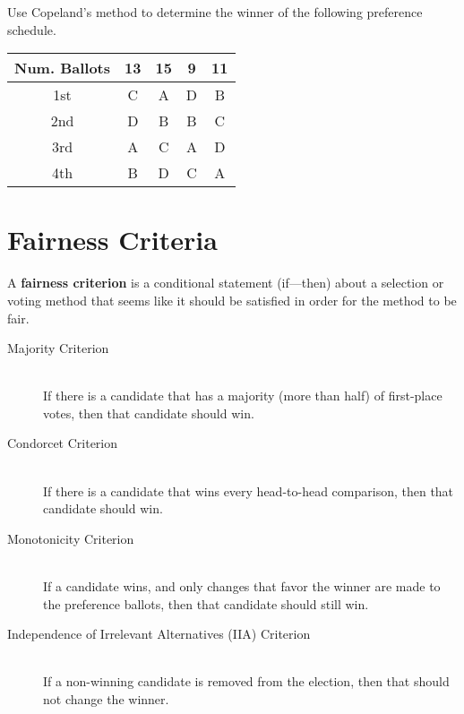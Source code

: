 \begin{exercise}
  Use Copeland's method to determine the winner of the following
  preference schedule.

  \begin{center}
    \begin{tabular}[h]{ccccc}
      \toprule
      Num. Ballots & 13 & 15 & 9 & 11 \\
      \midrule
      1st & C & A & D & B \\
      2nd & D & B & B & C \\
      3rd & A & C & A & D \\
      4th & B & D & C & A \\
      \bottomrule
    \end{tabular}
  \end{center}

\end{exercise}

\newpage

\section{Fairness Criteria}%
\label{sec:fairness criteria}

\begin{definition}
  A \textbf{fairness criterion} is a conditional statement (if---then)
  about a selection or voting method that seems like it should be
  satisfied in order for the method to be fair.
\end{definition}

\begin{description}
\item[Majority Criterion] \hfill \\
  If there is a candidate that has a majority (more than half) of
  first-place votes, then that candidate should win.
\item[Condorcet Criterion] \hfill \\
  If there is a candidate that wins every head-to-head comparison,
  then that candidate should win.
\item[Monotonicity Criterion] \hfill \\
  If a candidate wins, and only changes that favor the winner are made
  to the preference ballots, then that candidate should still win.
\item[Independence of Irrelevant Alternatives (IIA) Criterion] \hfill \\
  If a non-winning candidate is removed from the election, then that
  should not change the winner.
\end{description}

